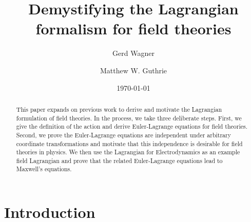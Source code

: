 \documentclass[prb,preprint]{revtex4-1}
\begin{document}
\title{Demystifying the Lagrangian formalism for field theories}

\author{Gerd Wagner}

\author{Matthew W. Guthrie}


\date{\today}

\begin{abstract} This paper expands on previous work\cite{guthrie2019demystifying} to derive and motivate the Lagrangian formulation of field theories.
In the process, we take three deliberate steps.
First, we give the definition of the action and derive Euler-Lagrange equations for field theories.
Second, we prove the Euler-Lagrange equations are independent under arbitrary coordinate transformations and motivate that this independence is desirable for field theories in physics.
We then use the Lagrangian for Electrodynamics as an example field Lagrangian and prove that the related Euler-Lagrange equations lead to Maxwell's equations.
\end{abstract}

\maketitle


\section{Introduction}
\end{document}
